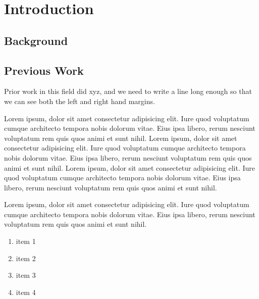 

\chapter[Introduction]{Introduction}

\section{Background}
\section{Previous Work} %

Prior work in this field did xyz, and we need to write a line long enough so that we can see both the left and right hand margins.

Lorem ipsum, dolor sit amet consectetur adipisicing elit. Iure quod voluptatum cumque architecto tempora nobis dolorum vitae. Eius ipsa libero, \cite{matt_eg_1} rerum nesciunt voluptatum rem quis quos animi et sunt nihil.
Lorem ipsum, dolor sit amet consectetur adipisicing elit. Iure quod voluptatum cumque architecto tempora nobis dolorum vitae. Eius ipsa libero, rerum nesciunt voluptatum rem quis quos animi et sunt nihil.
Lorem ipsum, dolor sit amet consectetur adipisicing elit. Iure quod voluptatum cumque architecto tempora nobis dolorum vitae. Eius ipsa libero, rerum nesciunt voluptatum rem quis quos animi et sunt nihil.


Lorem ipsum, dolor sit amet consectetur adipisicing elit. Iure quod voluptatum cumque architecto tempora nobis dolorum vitae. Eius ipsa libero, rerum nesciunt voluptatum rem quis quos animi et sunt nihil.
\begin{enumerate}
  \item item 1
  
  \item item 2
  
  \item item 3
  
  \item item 4 
\end{enumerate}


